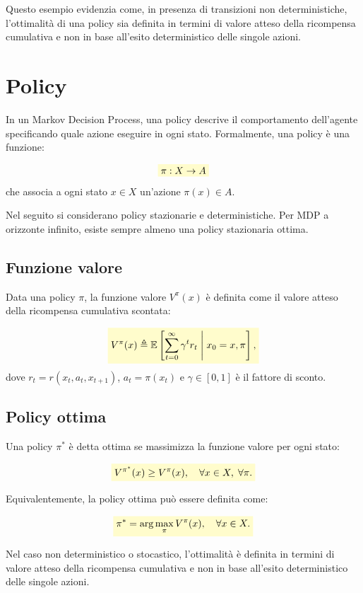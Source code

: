 \documentclass[a4paper,12pt]{report}
\newcommand{\highlight}[1]{%
\colorbox{yellow!20}{$\displaystyle #1$}%
}
\begin{document}
Questo esempio evidenzia come, in presenza di transizioni non deterministiche,
l'ottimalità di una policy sia definita in termini di valore atteso della
ricompensa cumulativa e non in base all'esito deterministico delle singole
azioni.

\section{Policy}

In un Markov Decision Process, una policy descrive il comportamento
dell'agente specificando quale azione eseguire in ogni stato.
Formalmente, una policy è una funzione:

\[
\highlight{
\pi : X \rightarrow A}
\]
che associa a ogni stato $x \in X$ un'azione $\pi(x) \in A$.

Nel seguito si considerano policy stazionarie e deterministiche. Per
MDP a orizzonte infinito, esiste sempre almeno una policy stazionaria
ottima.

\subsection{Funzione valore}

Data una policy $\pi$, la funzione valore $V^\pi(x)$ è definita come
il valore atteso della ricompensa cumulativa scontata:

\[
\highlight{
V^\pi(x) \triangleq \mathbb{E}\left[\sum_{t=0}^{\infty} \gamma^t r_t
\;\middle|\; x_0 = x, \pi \right],}
\]
dove $r_t = r(x_t, a_t, x_{t+1})$, $a_t = \pi(x_t)$ e
$\gamma \in [0,1]$ è il fattore di sconto.

\subsection{Policy ottima}

Una policy $\pi^*$ è detta ottima se massimizza la funzione valore
per ogni stato:

\[
\highlight{
V^{\pi^*}(x) \geq V^\pi(x), \quad \forall x \in X, \; \forall \pi .}
\]

Equivalentemente, la policy ottima può essere definita come:

\[
\highlight{
\pi^* = \arg\max_\pi V^\pi(x), \quad \forall x \in X .}
\]

Nel caso non deterministico o stocastico, l'ottimalità è definita in termini di valore atteso della ricompensa cumulativa e non in base all'esito deterministico delle singole azioni.
\end{document}
